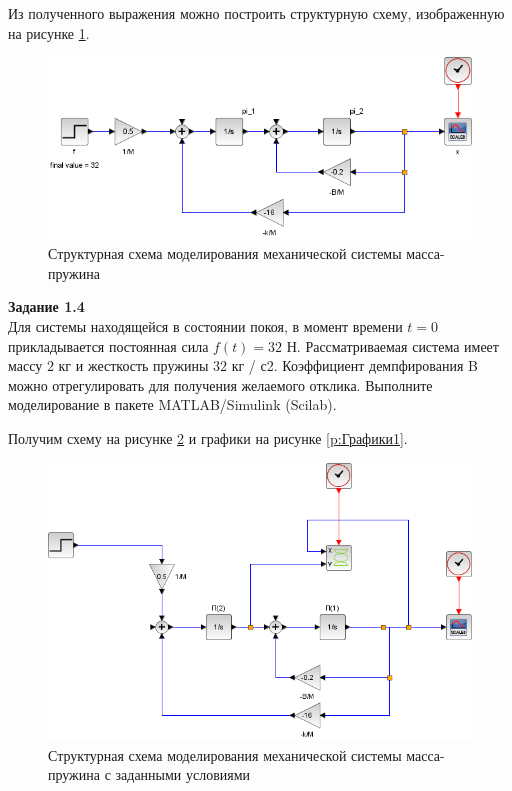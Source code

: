 \documentclass[a4paper, 12pt]{article}
\begin{document}
Из полученного выражения можно построить структурную схему, изображенную на рисунке \ref{p:Схема1}.

\begin{figure}[h!]
	\centering
	\includegraphics[scale=0.6]{scheme1-1}
	\caption{Структурная схема моделирования механической системы масса-пружина }
	\label{p:Схема1}
\end{figure}

\textbf{Задание 1.4 } \\
Для системы находящейся в состоянии покоя, в момент времени $t = 0$ прикладывается постоянная сила $f(t) = 32$ Н. Рассматриваемая система имеет массу $2$ кг и жесткость пружины $32$ кг / с2. Коэффициент демпфирования B можно отрегулировать для получения желаемого отклика. Выполните моделирование в пакете
MATLAB/Simulink (Scilab).

Получим схему на рисунке \ref{p:Схема2} и графики на рисунке \ref{p:Графики1}.

\begin{figure}[h!]
	\centering
	\includegraphics[scale=0.6]{scheme1-2}
	\caption{Структурная схема моделирования механической системы масса-пружина с заданными условиями }
	\label{p:Схема2}
\end{figure}
\end{document}
